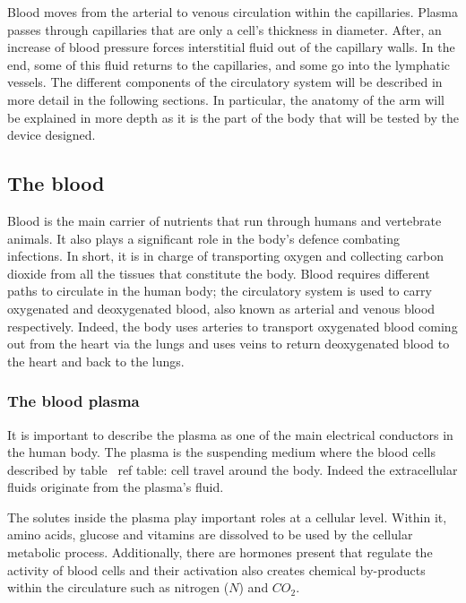 Blood moves from the arterial to venous circulation within the capillaries. Plasma passes through capillaries that are only a cell's thickness in diameter. After, an increase of blood pressure forces interstitial fluid out of the capillary walls. In the end, some of this fluid returns to the capillaries, and some go into the lymphatic vessels. The different components of the circulatory system will be described in more detail in the following sections. In particular, the anatomy of the arm will be explained in more depth as it is the part of the body that will be tested by the device designed.

\subsection{The blood}
\label{section literature 1.1}
Blood is the main carrier of nutrients that run through humans and vertebrate animals. It also plays a significant role in the body's defence combating infections. In short, it is in charge of transporting oxygen and collecting carbon dioxide from all the tissues that constitute the body. Blood requires different paths to circulate in the human body; the circulatory system is used to carry oxygenated and deoxygenated blood, also known as arterial and venous blood respectively. Indeed, the body uses arteries to transport oxygenated blood coming out from the heart via the lungs and uses veins to return deoxygenated blood to the heart and back to the lungs.

\subsubsection{The blood plasma}
It is important to describe the plasma as one of the main electrical conductors in the human body. The plasma is the suspending medium where the blood cells described by table \ ref {table: cell} travel around the body. Indeed the extracellular fluids originate from the plasma's fluid.

The solutes inside the plasma play important roles at a cellular level. Within it, amino acids, glucose and vitamins are dissolved to be used by the cellular metabolic process. Additionally, there are hormones present that regulate the activity of blood cells and their activation also creates chemical by-products within the circulature such as nitrogen ($N$) and $CO_2$.

